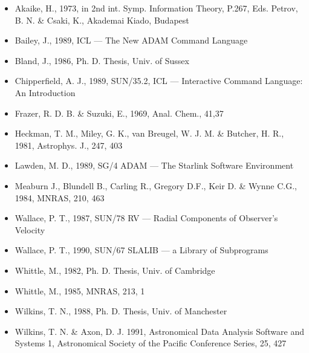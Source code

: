 \documentclass[11pt,twoside]{article}
\newcommand{\xref}[3]{#1}
\begin{document}
\begin{itemize}

\item
  Akaike, H., 1973, in 2nd int. Symp. Information Theory, P.267, Eds.
  Petrov, B. N. \& Csaki, K., Akademai Kiado, Budapest

\item
  Bailey, J., 1989, ICL --- The New ADAM Command Language

\item
  Bland, J., 1986, Ph. D. Thesis, Univ. of Sussex

\item
  Chipperfield, A. J., 1989, SUN/35.2, ICL --- Interactive Command Language:
  An Introduction

\item
  Frazer, R. D. B. \& Suzuki, E., 1969, Anal. Chem., 41,37

\item
  Heckman, T. M., Miley, G. K., van Breugel, W. J. M. \& Butcher, H. R.,
  1981, Astrophys. J., 247, 403

\item
  Lawden, M. D., 1989, SG/4 ADAM --- The Starlink Software Environment

\item
  Meaburn J., Blundell B., Carling R., Gregory D.F., Keir D. \& Wynne C.G.,
  1984, MNRAS, 210, 463

\item
  Wallace, P. T., 1987, \xref{SUN/78}{sun78}{} RV --- Radial Components of
  Observer's Velocity

\item
  Wallace, P. T., 1990, \xref{SUN/67}{sun67}{} SLALIB --- a Library of
  Subprograms

\item
  Whittle, M., 1982, Ph. D. Thesis, Univ. of Cambridge

\item
  Whittle, M., 1985, MNRAS, 213, 1

\item
  Wilkins, T. N., 1988, Ph. D. Thesis, Univ. of Manchester

\item
  Wilkins, T. N. \& Axon, D. J. 1991, Astronomical Data Analysis
  Software and Systems 1, Astronomical Society of the Pacific Conference
  Series, 25, 427

\end{itemize}

\end{document}
